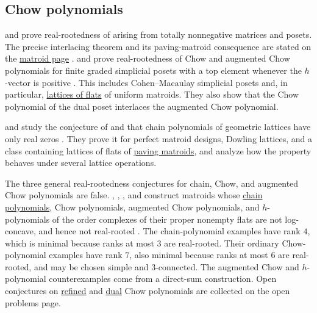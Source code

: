 \subsection[realRootsChow]{Chow polynomials}

 and  prove real-rootedness of
\label{chowPolynomialDefinition} arising from
totally nonnegative matrices and posets.  The precise interlacing theorem and
its paving-matroid consequence are stated on the
\hyperref[matroidChowPolynomials]{matroid page} \cite{BrandenVecchi2025x}.
 and  prove real-rootedness of Chow
and augmented Chow polynomials for finite graded simplicial posets with a top
element whenever the $h$-vector is positive \cite{HosterStump2025x}.  This
includes Cohen--Macaulay simplicial posets and, in particular,
\hyperref[latticeOfFlats]{lattices of flats} of uniform matroids.  They also
show that the Chow polynomial of the dual poset interlaces the augmented
Chow polynomial.

 and  study the
conjecture of  and  that chain polynomials of geometric lattices have only
real zeros \cite{BrandenLeite2025x}.  They prove it for perfect matroid
designs, Dowling lattices, and a class containing lattices of flats of
\hyperref[pavingMatroid]{paving matroids}, and analyze how the property behaves under several lattice
operations.

The three general real-rootedness conjectures for chain, Chow, and augmented
Chow polynomials are false.  ,
, , and 
construct matroids whose \hyperref[chainPolynomial]{chain polynomials},
Chow polynomials, augmented Chow polynomials, and $h$-polynomials of the order
complexes of their proper nonempty flats are not log-concave, and hence not
real-rooted \cite[Thms.~A--C and Cor.~D]{BercziCoronEurLi2026x}.  The
chain-polynomial examples have rank $4$, which is minimal because ranks at
most $3$ are real-rooted.  Their ordinary Chow-polynomial examples have rank
$7$, also minimal because ranks at most $6$ are real-rooted, and may be chosen
simple and $3$-connected.  The augmented Chow and $h$-polynomial
counterexamples come from a direct-sum construction.  Open conjectures on
\hyperref[conjRefinedChow]{refined} and \hyperref[conjDualChow]{dual} Chow
polynomials are collected on the open problems page.

